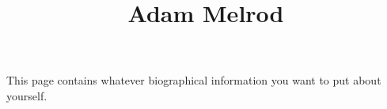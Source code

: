 \documentclass[a4paper]{article}
\title{Adam Melrod}
\date{}
\begin{document}
\maketitle
\par{This page contains whatever biographical information you want to put about yourself.}
\printbibliography
\end{document}
